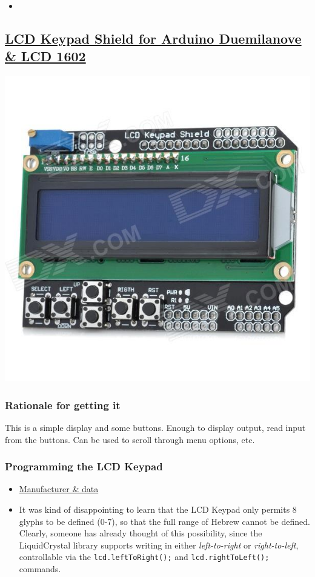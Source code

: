 \documentclass[11pt]{article}
\begin{document}
\begin{itemize}
\item 
\end{itemize}
\subsection{\href{http://dx.com/p/lcd-keypad-shield-for-arduino-duemilanove-lcd-1602-118059}{LCD Keypad Shield for Arduino Duemilanove \& LCD 1602}}
\label{sec-4-3}

\includegraphics[width=.9\linewidth]{./files/sku_118059_1.jpg}

\subsubsection{Rationale for getting it}
\label{sec-4-3-1}

This is a simple display and some buttons. Enough to display output, read input from the buttons. Can be used to scroll through menu options, etc.
\subsubsection{Programming the LCD Keypad}
\label{sec-4-3-2}

\begin{itemize}
\item \href{http://www.dfrobot.com/wiki/index.php?title=Arduino_LCD_KeyPad_Shield_(SKU:_DFR0009)}{Manufacturer \& data}
\item It was kind of disappointing to learn that the LCD Keypad only permits 8 glyphs to be defined (0-7), so that the full range of Hebrew cannot be defined. Clearly, someone has already thought of this possibility, since the LiquidCrystal library supports writing in either \emph{left-to-right} or \emph{right-to-left}, controllable via the \texttt{lcd.leftToRight();} and \texttt{lcd.rightToLeft();} commands.
\end{itemize}
\end{document}
